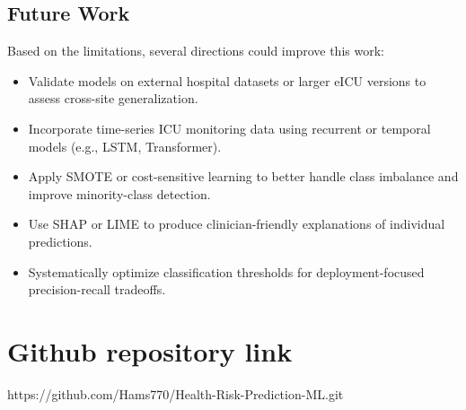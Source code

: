 \documentclass[11pt]{article}
\begin{document}
\subsection{Future Work
}
Based on the limitations, several directions could improve this work:
\begin{itemize}
    \item \textbf{} Validate models on external hospital datasets or larger eICU versions to assess cross-site generalization.

    \item \textbf{} Incorporate time-series ICU monitoring data using recurrent or temporal models (e.g., LSTM, Transformer).

    \item \textbf{} Apply SMOTE or cost-sensitive learning to better handle class imbalance and improve minority-class detection.

    \item \textbf{} Use SHAP or LIME to produce clinician-friendly explanations of individual predictions.

    \item \textbf{} Systematically optimize classification thresholds for deployment-focused precision-recall tradeoffs.

    \end{itemize}

\section{Github repository link}
https://github.com/Hams770/Health-Risk-Prediction-ML.git
\end{document}
